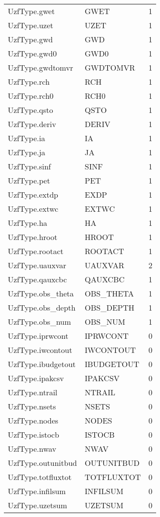 \begin{longtable}{p{6cm} p{4cm} p{2cm} }
UzfType.gwet &  GWET & 1 \\ 
UzfType.uzet &  UZET & 1 \\ 
UzfType.gwd &  GWD & 1 \\ 
UzfType.gwd0 &  GWD0 & 1 \\ 
UzfType.gwdtomvr &  GWDTOMVR & 1 \\ 
UzfType.rch &  RCH & 1 \\ 
UzfType.rch0 &  RCH0 & 1 \\ 
UzfType.qsto &  QSTO & 1 \\ 
UzfType.deriv &  DERIV & 1 \\ 
UzfType.ia &  IA & 1 \\ 
UzfType.ja &  JA & 1 \\ 
UzfType.sinf &  SINF & 1 \\ 
UzfType.pet &  PET & 1 \\ 
UzfType.extdp &  EXDP & 1 \\ 
UzfType.extwc &  EXTWC & 1 \\ 
UzfType.ha &  HA & 1 \\ 
UzfType.hroot &  HROOT & 1 \\ 
UzfType.rootact &  ROOTACT & 1 \\ 
UzfType.uauxvar &  UAUXVAR & 2 \\ 
UzfType.qauxcbc &  QAUXCBC & 1 \\ 
UzfType.obs\_theta &  OBS\_THETA & 1 \\ 
UzfType.obs\_depth &  OBS\_DEPTH & 1 \\ 
UzfType.obs\_num &  OBS\_NUM & 1 \\ 
UzfType.iprwcont &  IPRWCONT & 0 \\ 
UzfType.iwcontout &  IWCONTOUT & 0 \\ 
UzfType.ibudgetout &  IBUDGETOUT & 0 \\ 
UzfType.ipakcsv &  IPAKCSV & 0 \\ 
UzfType.ntrail &  NTRAIL & 0 \\ 
UzfType.nsets &  NSETS & 0 \\ 
UzfType.nodes &  NODES & 0 \\ 
UzfType.istocb &  ISTOCB & 0 \\ 
UzfType.nwav &  NWAV & 0 \\ 
UzfType.outunitbud &  OUTUNITBUD & 0 \\ 
UzfType.totfluxtot &  TOTFLUXTOT & 0 \\ 
UzfType.infilsum &  INFILSUM & 0 \\ 
UzfType.uzetsum &  UZETSUM & 0 \\ 

\end{longtable}
